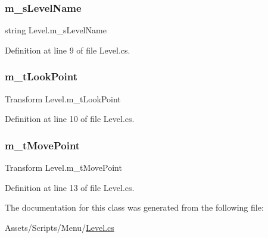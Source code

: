 \subsubsection{\texorpdfstring{m\+\_\+s\+Level\+Name}{m\_sLevelName}}
{\footnotesize\ttfamily string Level.\+m\+\_\+s\+Level\+Name}



Definition at line 9 of file Level.\+cs.

\mbox{\label{class_level_a4da3437f8e9c5f5b706284daad063252}} 
\subsubsection{\texorpdfstring{m\+\_\+t\+Look\+Point}{m\_tLookPoint}}
{\footnotesize\ttfamily Transform Level.\+m\+\_\+t\+Look\+Point}



Definition at line 10 of file Level.\+cs.

\mbox{\label{class_level_a7284d976035d566382e1a120e3fd79cc}} 
\subsubsection{\texorpdfstring{m\+\_\+t\+Move\+Point}{m\_tMovePoint}}
{\footnotesize\ttfamily Transform Level.\+m\+\_\+t\+Move\+Point}



Definition at line 13 of file Level.\+cs.



The documentation for this class was generated from the following file\+:\begin{DoxyCompactItemize}
\item 
Assets/\+Scripts/\+Menu/\mbox{\hyperlink{_level_8cs}{Level.\+cs}}\end{DoxyCompactItemize}
